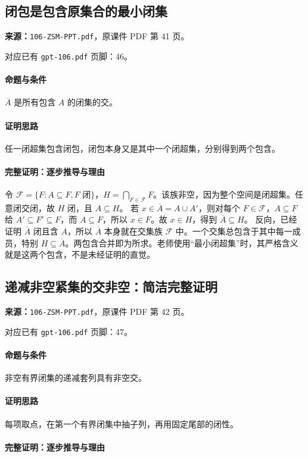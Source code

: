 \clearpage\subsection{闭包是包含原集合的最小闭集}
\textbf{来源：}\texttt{106-ZSM-PPT.pdf}，原课件 PDF 第 41 页。\par
对应已有 \texttt{gpt-106.pdf} 页脚：46。\par
\paragraph{命题与条件}$\overline A$ 是所有包含 $A$ 的闭集的交。
\paragraph{证明思路}任一闭超集包含闭包，闭包本身又是其中一个闭超集，分别得到两个包含。
\paragraph{完整证明：逐步推导与理由}

令 $\mathcal F=\{F:A\subseteq F,F\text{ 闭}\}$，$H=\bigcap_{F\in\mathcal F}F$。该族非空，因为整个空间是闭超集。任意闭交闭，故 $H$ 闭，且 $A\subseteq H$。
若 $x\in\overline A=A\cup A'$，则对每个 $F\in\mathcal F$，$A\subseteq F$ 给 $A'\subseteq F'\subseteq F$，而 $A\subseteq F$，所以 $x\in F$。故 $x\in H$，得到 $\overline A\subseteq H$。
反向，已经证明 $\overline A$ 闭且含 $A$，所以 $\overline A$ 本身就在交集族 $\mathcal F$ 中。一个交集总包含于其中每一成员，特别 $H\subseteq\overline A$。两包含合并即为所求。老师使用“最小闭超集”时，其严格含义就是这两个包含，不是未经证明的直觉。

\clearpage\subsection{递减非空紧集的交非空：简洁完整证明}
\textbf{来源：}\texttt{106-ZSM-PPT.pdf}，原课件 PDF 第 42 页。\par
对应已有 \texttt{gpt-106.pdf} 页脚：47。\par
\paragraph{命题与条件}非空有界闭集的递减套列具有非空交。
\paragraph{证明思路}每项取点，在第一个有界闭集中抽子列，再用固定尾部的闭性。
\paragraph{完整证明：逐步推导与理由}

